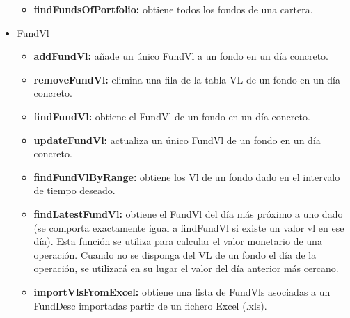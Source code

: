 \documentclass[12pt, a4paper]{book}
\begin{document}
\begin{itemize}
\begin{itemize}
							\item \textbf{findFundsOfPortfolio:} obtiene todos los fondos de una cartera.
						\end{itemize}
					\newpage
	\item FundVl
						\begin{itemize}
							\item\textbf{addFundVl:} añade un único FundVl a un fondo en un día concreto.
							\item\textbf{removeFundVl:} elimina una fila de la tabla \gls{VL} de un fondo en un día concreto.
							\item \textbf{findFundVl:} obtiene el FundVl de un fondo en un día concreto.
							\item \textbf{updateFundVl:} actualiza un único FundVl de un fondo en un día concreto.
							\item \textbf{findFundVlByRange:} obtiene los Vl de un fondo dado en el intervalo de tiempo deseado.
							\item \textbf{findLatestFundVl:} obtiene el FundVl del día más próximo a uno dado (se comporta exactamente igual a findFundVl si existe un valor vl en ese día). Esta función se utiliza para calcular el valor monetario de una operación. Cuando no se disponga del \gls{VL} de un fondo el día de la operación, se utilizará en su lugar el valor del día anterior más cercano.
							\item \textbf{importVlsFromExcel:} obtiene una lista de FundVls asociadas a un FundDesc importadas partir de un fichero Excel (.xls).
							
					\end{itemize}
				

\end{itemize}
\end{document}
